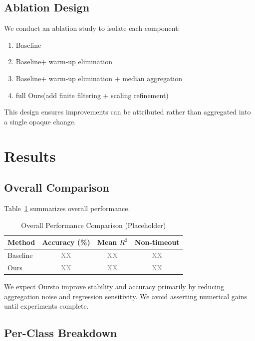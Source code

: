 \documentclass[conference]{IEEEtran}
\newcommand{\ours}{Ours}
\newcommand{\baseline}{Baseline}
\newcommand{\placeholder}{\textcolor{gray}{XX}}
\begin{document}
\subsection{Ablation Design}

We conduct an ablation study to isolate each component:
\begin{enumerate}[leftmargin=1.2em]
\item \baseline
\item \baseline + warm-up elimination
\item \baseline + warm-up elimination + median aggregation
\item full \ours (add finite filtering + scaling refinement)
\end{enumerate}

This design ensures improvements can be attributed rather than aggregated into a
single opaque change.

\section{Results}
\label{sec:results}

\subsection{Overall Comparison}

Table~\ref{tab:main} summarizes overall performance.

\begin{table}[t]
\centering
\caption{Overall Performance Comparison (Placeholder)}
\label{tab:main}
\begin{tabular}{lccc}
\toprule
Method & Accuracy (\%) & Mean $R^2$ & Non-timeout \\
\midrule
\baseline & \placeholder & \placeholder & \placeholder \\
\ours & \placeholder & \placeholder & \placeholder \\
\bottomrule
\end{tabular}
\end{table}

We expect \ours to improve stability and accuracy primarily by reducing
aggregation noise and regression sensitivity.
We avoid asserting numerical gains until experiments complete.

\subsection{Per-Class Breakdown}
\end{document}
